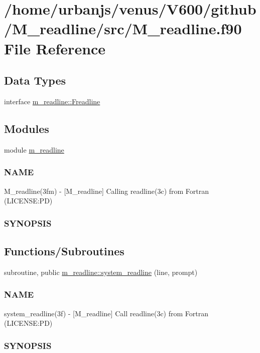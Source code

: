 \hypertarget{M__readline_8f90}{}\section{/home/urbanjs/venus/\+V600/github/\+M\+\_\+readline/src/\+M\+\_\+readline.f90 File Reference}
\label{M__readline_8f90}
\subsection*{Data Types}
\begin{DoxyCompactItemize}
\item 
interface \mbox{\hyperlink{interfacem__readline_1_1Freadline}{m\+\_\+readline\+::\+Freadline}}
\end{DoxyCompactItemize}
\subsection*{Modules}
\begin{DoxyCompactItemize}
\item 
module \mbox{\hyperlink{namespacem__readline}{m\+\_\+readline}}
\begin{DoxyCompactList}\small\item\em \subsubsection*{N\+A\+ME}

M\+\_\+readline(3fm) -\/ \mbox{[}M\+\_\+readline\mbox{]} Calling readline(3c) from Fortran (L\+I\+C\+E\+N\+SE\+:PD) \subsubsection*{S\+Y\+N\+O\+P\+S\+IS}\end{DoxyCompactList}\end{DoxyCompactItemize}
\subsection*{Functions/\+Subroutines}
\begin{DoxyCompactItemize}
\item 
subroutine, public \mbox{\hyperlink{namespacem__readline_a6eae368d34bd43ead64623b2d6d10ae0}{m\+\_\+readline\+::system\+\_\+readline}} (line, prompt)
\begin{DoxyCompactList}\small\item\em \subsubsection*{N\+A\+ME}

system\+\_\+readline(3f) -\/ \mbox{[}M\+\_\+readline\mbox{]} Call readline(3c) from Fortran (L\+I\+C\+E\+N\+SE\+:PD) \subsubsection*{S\+Y\+N\+O\+P\+S\+IS}\end{DoxyCompactList}\end{DoxyCompactItemize}
